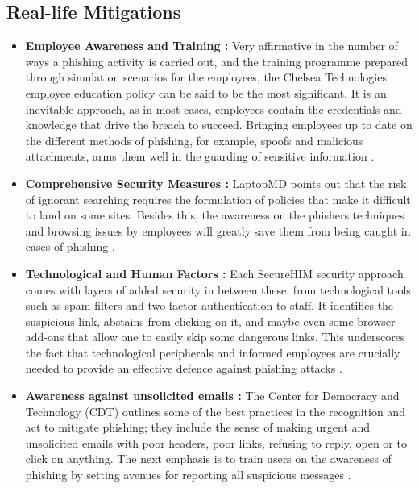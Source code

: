 \subsection{Real-life Mitigations} 

\begin{itemize}
    \item \textbf{Employee Awareness and Training :} Very affirmative in the number of ways a phishing activity is carried out, and the training programme prepared through simulation scenarios for the employees, the Chelsea Technologies employee education policy can be said to be the most significant. It is an inevitable approach, as in most cases, employees contain the credentials and knowledge that drive the breach to succeed. Bringing employees up to date on the different methods of phishing, for example, spoofs and malicious attachments, arms them well in the guarding of sensitive information \cite{DigitalGuardianPhishingPrevention}.

     \item \textbf{Comprehensive Security Measures :} LaptopMD points out that the risk of ignorant searching requires the formulation of policies that make it difficult to land on some sites. Besides this, the awareness on the phishers techniques and browsing issues by employees will greatly save them from being caught in cases of phishing \cite{DigitalGuardianPhishingPrevention}.
     
     \item \textbf{Technological and Human Factors :} Each SecureHIM security approach comes with layers of added security in between these, from technological tools such as spam filters and two-factor authentication to staff. It identifies the suspicious link, abstains from clicking on it, and maybe even some browser add-ons that allow one to easily skip some dangerous links. This underscores the fact that technological peripherals and informed employees are crucially needed to provide an effective defence against phishing attacks \cite{DigitalGuardianPhishingPrevention}.

     \item \textbf{Awareness against unsolicited emails :} The Center for Democracy and Technology (CDT) outlines some of the best practices in the recognition and act to mitigate phishing; they include the sense of making urgent and unsolicited emails with poor headers, poor links, refusing to reply, open or to click on anything. The next emphasis is to train users on the awareness of phishing by setting avenues for reporting all suspicious messages \cite{CDTPhishingMitigation}.
     
     
\end{itemize}

